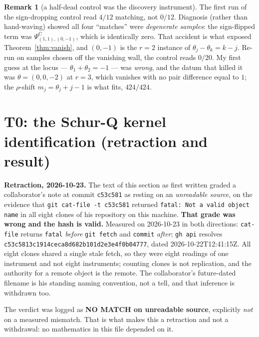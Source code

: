\documentclass[11pt]{article}
\theoremstyle{definition}
\newtheorem{remark}[theorem]{Remark}
\theoremstyle{remark}
\newcommand{\PsiC}{\Psi^{\mathrm{C}}}
\begin{document}
\begin{remark}[a half-dead control was the discovery instrument]
The first run of the sign-dropping control read $4/12$ matching, not $0/12$. Diagnosis
(rather than hand-waving) showed all four ``matches'' were \emph{degenerate samples}: the
sign-flipped term was $\PsiC_{(1,1),(0,-1)}$, which is identically zero. That accident is
what exposed Theorem~\ref{thm:vanish}, and $(0,-1)$ is the $r=2$ instance of
$\theta_j-\theta_k=k-j$. Re-run on samples chosen off the vanishing wall, the control reads
$0/20$. My first guess at the locus --- $\theta_1+\theta_2=-1$ --- was \emph{wrong}, and
the datum that killed it was $\theta=(0,0,-2)$ at $r=3$, which vanishes with no pair
difference equal to $1$; the $\rho$-shift $m_j=\theta_j+j-1$ is what fits, $424/424$.
\end{remark}

\section{T0: the Schur-Q kernel identification (retraction and result)}\label{sec:T0}

\textbf{Retraction, 2026-10-23.} The text of this section as first written graded a
collaborator's note at commit \texttt{c53c581} as resting on an \emph{unreadable source}, on
the evidence that \texttt{git cat-file -t c53c581} returned \texttt{fatal: Not a valid object
name} in all eight clones of his repository on this machine. \textbf{That grade was wrong and
the hash is valid.} Measured on 2026-10-23 in both directions: \texttt{cat-file} returns
\texttt{fatal} \emph{before} \texttt{git fetch} and \texttt{commit} \emph{after}; \texttt{gh
api} resolves \texttt{c53c5813c1914ceca8d682b101d2e3e4f0b04777}, dated 2026-10-22T12:41:15Z.
All eight clones shared a single stale fetch, so they were eight readings of one instrument and
not eight instruments; counting clones is not replication, and the authority for a remote
object is the remote. The collaborator's future-dated filename is his standing naming
convention, not a tell, and that inference is withdrawn too.

The verdict was logged as \textbf{NO MATCH on unreadable source}, explicitly \emph{not} on a
measured mismatch. That is what makes this a retraction and not a withdrawal: no mathematics in
this file depended on it.
\end{document}
